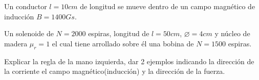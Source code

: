 \documentclass[./examen.tex]{subfiles}
\begin{document}
\begin{questions}
\question  Un conductor $l=10cm$ de longitud se mueve dentro de un campo magnético de inducción $B=1400Gs$. 
  \question Un solenoide de $N=2000$ espiras, longitud de $l=50cm$, $\varnothing=4cm$ y núcleo de madera $\mu_r=1$ el cual tiene arrollado sobre él una bobina de $N=1500$ espiras. 
  \question[1] Explicar la regla de la mano izquierda, dar 2 ejemplos indicando la dirección de la corriente el campo magnético(inducción) y la dirección de la fuerza.
  \end{questions}
 
\end{document}
